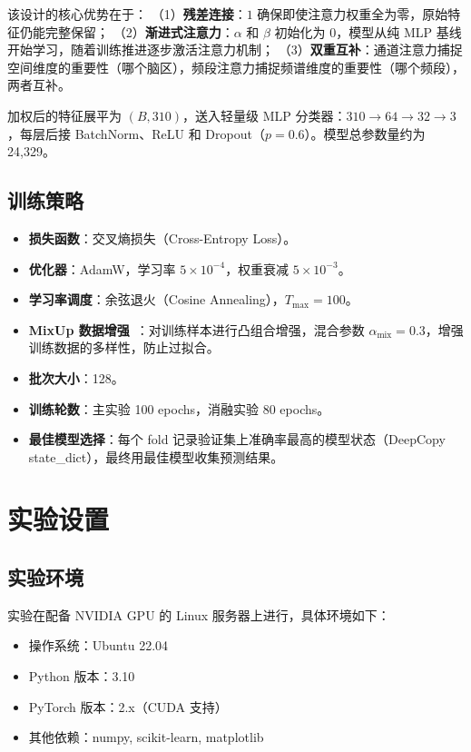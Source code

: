 \documentclass[12pt,a4paper]{ctexart}
\begin{document}
该设计的核心优势在于：
（1）\textbf{残差连接}：$1$ 确保即使注意力权重全为零，原始特征仍能完整保留；
（2）\textbf{渐进式注意力}：$\alpha$ 和 $\beta$ 初始化为 0，模型从纯 MLP 基线开始学习，随着训练推进逐步激活注意力机制；
（3）\textbf{双重互补}：通道注意力捕捉空间维度的重要性（哪个脑区），频段注意力捕捉频谱维度的重要性（哪个频段），两者互补。

加权后的特征展平为 $(B, 310)$，送入轻量级 MLP 分类器：$310 \to 64 \to 32 \to 3$，每层后接 BatchNorm、ReLU 和 Dropout（$p=0.6$）。模型总参数量约为 24,329。

\subsection{训练策略}

\begin{itemize}[itemsep=0pt]
    \item \textbf{损失函数}：交叉熵损失（Cross-Entropy Loss）。
    \item \textbf{优化器}：AdamW，学习率 $5 \times 10^{-4}$，权重衰减 $5 \times 10^{-3}$。
    \item \textbf{学习率调度}：余弦退火（Cosine Annealing），$T_{\max}=100$。
    \item \textbf{MixUp 数据增强}~\cite{mixup}：对训练样本进行凸组合增强，混合参数 $\alpha_{\text{mix}}=0.3$，增强训练数据的多样性，防止过拟合。
    \item \textbf{批次大小}：128。
    \item \textbf{训练轮数}：主实验 100 epochs，消融实验 80 epochs。
    \item \textbf{最佳模型选择}：每个 fold 记录验证集上准确率最高的模型状态（DeepCopy state\_dict），最终用最佳模型收集预测结果。
\end{itemize}


\section{实验设置}

\subsection{实验环境}

实验在配备 NVIDIA GPU 的 Linux 服务器上进行，具体环境如下：
\begin{itemize}[itemsep=0pt]
    \item 操作系统：Ubuntu 22.04
    \item Python 版本：3.10
    \item PyTorch 版本：2.x（CUDA 支持）
    \item 其他依赖：numpy, scikit-learn, matplotlib
\end{itemize}
\end{document}
